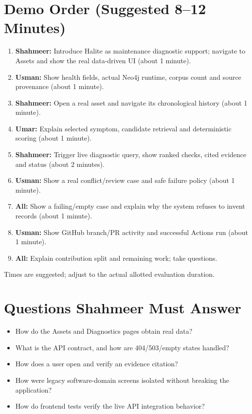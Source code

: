 \documentclass[11pt,a4paper,oneside]{report}
\begin{document}
\section{Demo Order (Suggested 8--12 Minutes)}
\begin{enumerate}
\item \textbf{Shahmeer:} Introduce Halite as maintenance diagnostic support; navigate to Assets and show the real data-driven UI (about 1 minute).
\item \textbf{Usman:} Show health fields, actual Neo4j runtime, corpus count and source provenance (about 1 minute).
\item \textbf{Shahmeer:} Open a real asset and navigate its chronological history (about 1 minute).
\item \textbf{Umar:} Explain selected symptom, candidate retrieval and deterministic scoring (about 1 minute).
\item \textbf{Shahmeer:} Trigger live diagnostic query, show ranked checks, cited evidence and status (about 2 minutes).
\item \textbf{Usman:} Show a real conflict/review case and safe failure policy (about 1 minute).
\item \textbf{All:} Show a failing/empty case and explain why the system refuses to invent records (about 1 minute).
\item \textbf{Usman:} Show GitHub branch/PR activity and successful Actions run (about 1 minute).
\item \textbf{All:} Explain contribution split and remaining work; take questions.
\end{enumerate}
Times are suggested; adjust to the actual allotted evaluation duration.

\section{Questions Shahmeer Must Answer}
\begin{itemize}
\item How do the Assets and Diagnostics pages obtain real data?
\item What is the API contract, and how are 404/503/empty states handled?
\item How does a user open and verify an evidence citation?
\item How were legacy software-domain screens isolated without breaking the application?
\item How do frontend tests verify the live API integration behavior?
\end{itemize}
\end{document}
